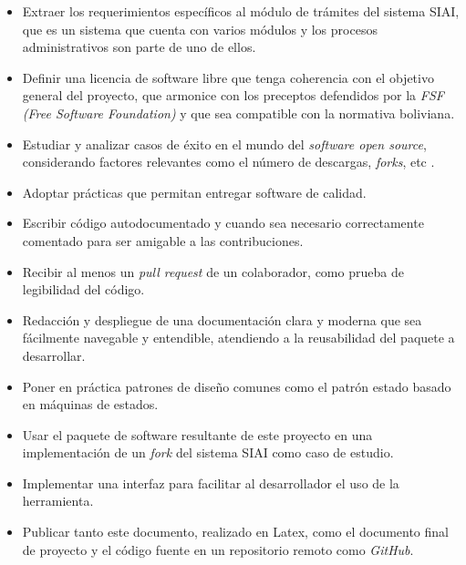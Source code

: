 \begin{itemize}
    \item Extraer los requerimientos específicos al módulo de trámites del
          sistema SIAI, que es un sistema que cuenta con varios módulos y los
          procesos administrativos son parte de uno de ellos.

    \item Definir una licencia de software libre que tenga coherencia con el
          objetivo general del proyecto, que armonice con los preceptos defendidos
          por la \textit{FSF (Free Software Foundation)} y que sea compatible con la
          normativa boliviana.

    \item Estudiar y analizar casos de éxito en el mundo del \textit{software open
              source}, considerando factores relevantes como el número de descargas,
          \textit{forks}, etc \cite{mujahidWhatAreCharacteristics2023}.

    \item Adoptar prácticas que permitan entregar software de calidad.

    \item Escribir código autodocumentado y cuando sea necesario correctamente
          comentado para ser amigable a las contribuciones.

    \item Recibir al menos un \textit{pull request} de un colaborador, como prueba de
          legibilidad del código.

    \item Redacción y despliegue de una documentación clara y moderna que sea
          fácilmente navegable y entendible, atendiendo a la reusabilidad del
          paquete a desarrollar.

    \item Poner en práctica patrones de diseño comunes como el patrón estado
          basado en máquinas de estados.

    \item Usar el paquete de software resultante de este proyecto en una
          implementación de un \textit{fork} del sistema SIAI como caso de estudio.

    \item Implementar una interfaz para facilitar al desarrollador el uso de la
          herramienta.

    \item Publicar tanto este documento, realizado en Latex, como el documento
          final de proyecto y el código fuente en un repositorio remoto como
          \textit{GitHub}.


\end{itemize}
